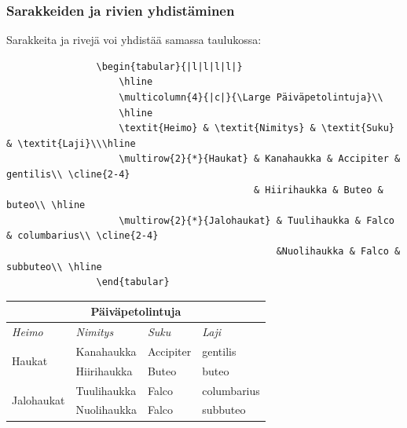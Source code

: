 \documentclass[handout,hyperref={colorlinks=true}]{beamer}
\theoremstyle{remark}
\newcommand{\vaihto}{\\ \vspace{10pt}}
\begin{document}
\begin{frame}[fragile]
    \frametitle{Sarakkeiden ja rivien yhdistäminen} 
    Sarakkeita ja rivejä voi yhdistää samassa taulukossa:\vaihto
    \begin{minipage}{8cm}
        \begin{scriptsize}
            \begin{verbatim}
                \begin{tabular}{|l|l|l|l|}
                    \hline
                    \multicolumn{4}{|c|}{\Large Päiväpetolintuja}\\
                    \hline
                    \textit{Heimo} & \textit{Nimitys} & \textit{Suku} & \textit{Laji}\\\hline
                    \multirow{2}{*}{Haukat} & Kanahaukka & Accipiter &  gentilis\\ \cline{2-4}
                                            & Hiirihaukka & Buteo & buteo\\ \hline
                    \multirow{2}{*}{Jalohaukat} & Tuulihaukka & Falco & columbarius\\ \cline{2-4}
                                                &Nuolihaukka & Falco & subbuteo\\ \hline
                \end{tabular}
            \end{verbatim}
        \end{scriptsize}
    \end{minipage}
    \begin{table}[h!]
        \begin{tabular}{|l|l|l|l|}
            \hline
            \multicolumn{4}{|c|}{\Large Päiväpetolintuja}\\
            \hline
            \textit{Heimo} & \textit{Nimitys} & \textit{Suku} & \textit{Laji}\\\hline
            \multirow{2}{*}{Haukat} & Kanahaukka & Accipiter &  gentilis\\ \cline{2-4}
                                    & Hiirihaukka & Buteo & buteo\\ \hline
            \multirow{2}{*}{Jalohaukat} & Tuulihaukka & Falco & columbarius\\ \cline{2-4}
                                        &Nuolihaukka & Falco & subbuteo\\ \hline
        \end{tabular}
    \end{table}

\end{frame}
\end{document}
